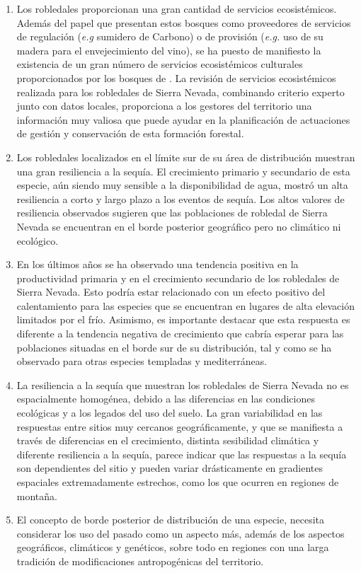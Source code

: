 \begin{enumerate}
    \item Los robledales proporcionan una gran cantidad de servicios ecosistémicos. Además del papel que presentan estos bosques como proveedores de servicios de regulación (\emph{e.g} sumidero de Carbono) o de provisión (\emph{e.g.} uso de su madera para el envejecimiento del vino), se ha puesto de manifiesto la existencia de un gran número de servicios ecosistémicos culturales proporcionados por los bosques de \Qp. La revisión de servicios ecosistémicos realizada para los robledales de Sierra Nevada, combinando criterio experto junto con datos locales, proporciona a los gestores del territorio una información muy valiosa que puede ayudar en la planificación de actuaciones de gestión y conservación de esta formación forestal. 
    
    \item Los robledales localizados en el límite sur de su área de distribución muestran una gran resiliencia a la sequía. El crecimiento primario y secundario de esta especie, aún siendo muy sensible a la disponibilidad de agua, mostró un alta resiliencia a corto y largo plazo a los eventos de sequía. Los altos valores de resiliencia observados sugieren que las poblaciones de robledal de Sierra Nevada se encuentran en el borde posterior geográfico pero no climático ni ecológico. 
    
    \item En los últimos años se ha observado una tendencia positiva en la productividad primaria y en el crecimiento secundario de los robledales de Sierra Nevada. Esto podría estar relacionado con un efecto positivo del calentamiento para las especies que se encuentran en lugares de alta elevación limitados por el frío. Asimismo, es importante destacar que esta respuesta es diferente a la tendencia negativa de crecimiento que cabría esperar para las poblaciones situadas en el borde sur de su distribución, tal y como se ha observado para otras especies templadas y mediterráneas. 
    
    \item La resiliencia a la sequía que muestran los robledales de Sierra Nevada no es espacialmente homogénea, debido a las diferencias en las condiciones ecológicas y a los legados del uso del suelo. La gran variabilidad en las respuestas entre sitios muy cercanos geográficamente, y que se manifiesta a través de diferencias en el crecimiento, distinta sesibilidad climática y diferente resiliencia a la sequía, parece indicar que las respuestas a la sequía son dependientes del sitio y pueden variar drásticamente en gradientes espaciales extremadamente estrechos, como los que ocurren en regiones de montaña. 
    
    \item El concepto de borde posterior de distribución de una especie, necesita considerar los uso del pasado como un aspecto más, además de los aspectos geográficos, climáticos y genéticos, sobre todo en regiones con una larga tradición de modificaciones antropogénicas del territorio.  
    
\end{enumerate}

